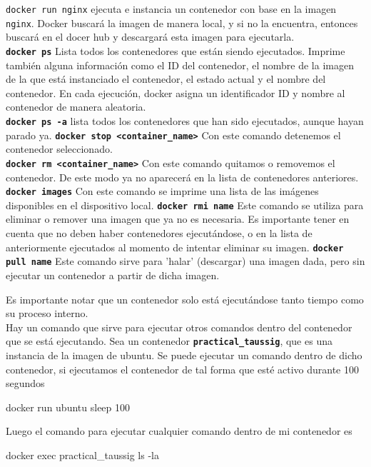 \texttt{docker run nginx} ejecuta e instancia un contenedor con base en la imagen \texttt{nginx}. Docker buscará la imagen de manera local, y si no la encuentra, entonces buscará en el docer hub y descargará esta imagen para ejecutarla. \\
\texttt{\textbf{docker ps}} Lista todos los contenedores que están siendo ejecutados. Imprime también alguna información como el ID del contenedor, el nombre de la imagen de la que está instanciado el contenedor, el estado actual y el nombre del contenedor. En cada ejecución, docker asigna un identificador ID y nombre al contenedor de manera aleatoria. \\
\texttt{\textbf{docker ps -a}} lista todos los contenedores que han sido ejecutados, aunque hayan parado ya.
\texttt{\textbf{docker stop <container\_name>}} Con este comando detenemos el contenedor seleccionado. \\
\texttt{\textbf{docker rm <container\_name>}} Con este comando quitamos o removemos el contenedor. De este modo ya no aparecerá en la lista de contenedores anteriores.
\texttt{\textbf{docker images}} Con este comando se imprime una lista de las imágenes disponibles en el dispositivo local.
\texttt{\textbf{docker rmi name}} Este comando se utiliza para eliminar o remover una imagen que ya no es necesaria. Es importante tener en cuenta que no deben haber contenedores ejecutándose, o en la lista de anteriormente ejecutados al momento de intentar eliminar su imagen.
\texttt{\textbf{docker pull name}} Este comando sirve para 'halar' (descargar) una imagen dada, pero sin ejecutar un contenedor a partir de dicha imagen. 

Es importante notar que un contenedor solo está ejecutándose tanto tiempo como su proceso interno. \\
Hay un comando que sirve para ejecutar otros comandos dentro del contenedor que se está ejecutando. Sea un contenedor \texttt{\textbf{practical\_taussig}}, que es una instancia de la imagen de ubuntu. Se puede ejecutar un comando dentro de dicho contenedor, si ejecutamos el contenedor de tal forma que esté activo durante 100 segundos\\

\begin{VerbatimBold}
    docker run ubuntu sleep 100
\end{VerbatimBold}

Luego el comando para ejecutar cualquier comando dentro de mi contenedor es 

\begin{VerbatimBold}
    docker exec practical_taussig ls -la
\end{VerbatimBold}

